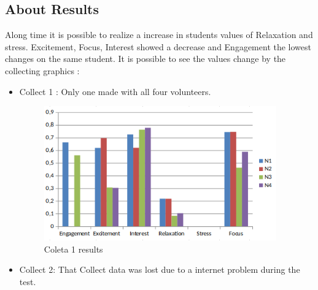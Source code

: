 \documentclass[12pt,openright,a4paper]{article}
\begin{document}
\subsection{About Results}
Along time it is possible to realize a increase in students values of Relaxation and stress. Excitement, Focus, Interest showed a decrease and Engagement the lowest changes on the same student. It is possible to see the values change by the collecting graphics :
\begin{itemize}
\item Collect 1 : Only one made with all four volunteers.
\begin{figure}[H]
	\centering
	\includegraphics[width=10cm]{./Coleta1.png}
    \caption{Coleta 1 results}
\end{figure}
\item Collect 2: That Collect data was lost due to a internet problem during the test.


\end{itemize}
\end{document}
